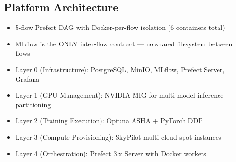 
\subsection{Platform Architecture}
\begin{itemize}
  \item 5-flow Prefect DAG with Docker-per-flow isolation (6 containers total)
  \item MLflow is the ONLY inter-flow contract --- no shared filesystem between flows
  \item Layer 0 (Infrastructure): PostgreSQL, MinIO, MLflow, Prefect Server, Grafana
  \item Layer 1 (GPU Management): NVIDIA MIG for multi-model inference partitioning
  \item Layer 2 (Training Execution): Optuna ASHA + PyTorch DDP
  \item Layer 3 (Compute Provisioning): SkyPilot multi-cloud spot instances
  \item Layer 4 (Orchestration): Prefect 3.x Server with Docker workers
\end{itemize}


